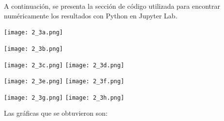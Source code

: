 \documentclass[12pt]{article}
\begin{document}
A continuación, se presenta la sección de código utilizada para encontrar numéricamente los resultados con Python en Jupyter Lab.
\begin{center}
    \texttt{[image: 2\_3a.png]}
\end{center}
\begin{center}
    \texttt{[image: 2\_3b.png]}
\end{center}
\begin{center}
    \texttt{[image: 2\_3c.png]}\hspace*{\fill}
    \texttt{[image: 2\_3d.png]}\\
\end{center}
\begin{center}
    \texttt{[image: 2\_3e.png]}\hspace*{\fill}
    \texttt{[image: 2\_3f.png]}\\
\end{center}
\begin{center}
    \texttt{[image: 2\_3g.png]}\hspace*{\fill}
    \texttt{[image: 2\_3h.png]}\\
\end{center}
Las gráficas que se obtuvieron son:
\end{document}
